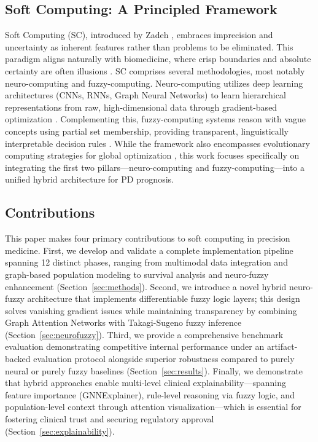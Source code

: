\documentclass[conference]{IEEEtran}
\begin{document}
\subsection{Soft Computing: A Principled Framework}

Soft Computing (SC), introduced by Zadeh \cite{zadeh1994soft}, embraces imprecision and uncertainty as inherent features rather than problems to be eliminated. This paradigm aligns naturally with biomedicine, where crisp boundaries and absolute certainty are often illusions \cite{torres2006fuzzy}. SC comprises several methodologies, most notably neuro-computing and fuzzy-computing. Neuro-computing utilizes deep learning architectures (CNNs, RNNs, Graph Neural Networks) to learn hierarchical representations from raw, high-dimensional data through gradient-based optimization \cite{lecun2015deep}. Complementing this, fuzzy-computing systems reason with vague concepts using partial set membership, providing transparent, linguistically interpretable decision rules \cite{zadeh1965fuzzy}. While the framework also encompasses evolutionary computing strategies for global optimization \cite{goldberg1989genetic}, this work focuses specifically on integrating the first two pillars---neuro-computing and fuzzy-computing---into a unified hybrid architecture for PD prognosis.

\subsection{Contributions}

This paper makes four primary contributions to soft computing in precision medicine. First, we develop and validate a complete implementation pipeline spanning 12 distinct phases, ranging from multimodal data integration and graph-based population modeling to survival analysis and neuro-fuzzy enhancement (Section~\ref{sec:methods}). Second, we introduce a novel hybrid neuro-fuzzy architecture that implements differentiable fuzzy logic layers; this design solves vanishing gradient issues while maintaining transparency by combining Graph Attention Networks with Takagi-Sugeno fuzzy inference (Section~\ref{sec:neurofuzzy}). Third, we provide a comprehensive benchmark evaluation demonstrating competitive internal performance under an artifact-backed evaluation protocol alongside superior robustness compared to purely neural or purely fuzzy baselines (Section~\ref{sec:results}). Finally, we demonstrate that hybrid approaches enable multi-level clinical explainability---spanning feature importance (GNNExplainer), rule-level reasoning via fuzzy logic, and population-level context through attention visualization---which is essential for fostering clinical trust and securing regulatory approval (Section~\ref{sec:explainability}).
\end{document}

